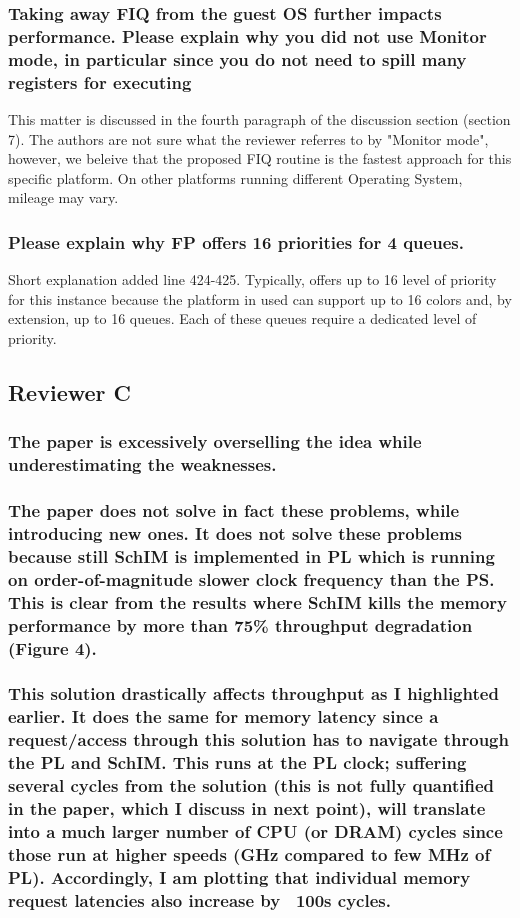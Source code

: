         \subsubsection{Taking away FIQ from the guest OS further impacts performance. Please explain why you did not use Monitor mode, in particular since you do not need to spill many registers for executing}
            This matter is discussed in the fourth paragraph of the discussion section (section 7).
            The authors are not sure what the reviewer referres to by "Monitor mode", however, we beleive that the proposed FIQ routine is the fastest approach for this specific platform. On other platforms running different Operating System, mileage may vary.

        \subsubsection{Please explain why FP offers 16 priorities for 4 queues.}
            Short explanation added line 424-425. Typically, \schim offers up to 16 level of priority for this instance because the platform in used can support up to 16 colors and, by extension, up to 16 queues. Each of these queues require a dedicated level of priority.

    \subsection{Reviewer C}
        \subsubsection{The paper is excessively overselling the idea while underestimating the weaknesses.}


        \subsubsection{The paper does not solve in fact these problems, while introducing new ones. It does not solve these problems because still SchIM is implemented in PL which is running on order-of-magnitude slower clock frequency than the PS. This is clear from the results where SchIM kills the memory performance by more than 75\% throughput degradation (Figure 4).}


        \subsubsection{This solution drastically affects throughput as I highlighted earlier. It does the same for memory latency since a request/access through this solution has to navigate through the PL and SchIM. This runs at the PL clock; suffering several cycles from the solution (this is not fully quantified in the paper, which I discuss in next point),  will translate into a much larger number of CPU (or DRAM) cycles since those run at higher speeds (GHz compared to few MHz of PL). Accordingly, I am plotting that individual memory request latencies also increase by ~100s cycles.}


